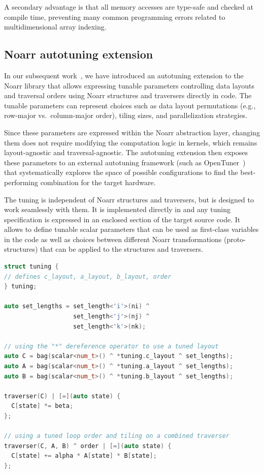 A secondary advantage is that all memory accesses are type-safe and checked at compile time, preventing many common programming errors related to multidimensional array indexing.


\subsection{Noarr autotuning extension}\label{sec:noarr-autotuning}

In our subsequent work~\cite{klepl2024abstractions}, we have introduced an autotuning extension to the Noarr library that allows expressing tunable parameters controlling data layouts and traversal orders using Noarr structures and traversers directly in \cpp code. The tunable parameters can represent choices such as data layout permutations (e.g., row-major vs.\ column-major order), tiling sizes, and parallelization strategies.

Since these parameters are expressed within the Noarr abstraction layer, changing them does not require modifying the computation logic in kernels, which remains layout-agnostic and traversal-agnostic. The autotuning extension then exposes these parameters to an external autotuning framework (such as OpenTuner~\cite{ansel2014opentuner}) that systematically explores the space of possible configurations to find the best-performing combination for the target hardware.

The tuning is independent of Noarr structures and traversers, but is designed to work seamlessly with them. It is implemented directly in \cpp and any tuning specification is expressed in an enclosed section of the target source code. It allows to define tunable scalar parameters that can be used as first-class \cpp variables in the code as well as choices between different Noarr transformations (proto-structures) that can be applied to the structures and traversers.

\begin{lstlisting}[language=C++, caption={Schema of how a tuning specification is used}]
struct tuning {
// defines c_layout, a_layout, b_layout, order
} tuning;

auto set_lengths = set_length<'i'>(ni) ^
                   set_length<'j'>(nj) ^
                   set_length<'k'>(nk);

// using the "*" dereference operator to use a tuned layout
auto C = bag(scalar<num_t>() ^ *tuning.c_layout ^ set_lengths);
auto A = bag(scalar<num_t>() ^ *tuning.a_layout ^ set_lengths);
auto B = bag(scalar<num_t>() ^ *tuning.b_layout ^ set_lengths);

traverser(C) | [=](auto state) {
  C[state] *= beta;
};

// using a tuned loop order and tiling on a combined traverser
traverser(C, A, B) ^ order | [=](auto state) {
  C[state] += alpha * A[state] * B[state];
};
\end{lstlisting}

